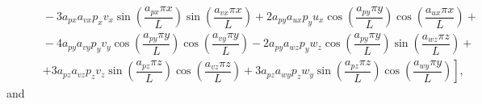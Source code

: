 \documentclass[10pt]{article}
\begin{document}
\begin{equation}
\begin{split}
    &\qquad-3 a_{px} a_{vx} p_x v_x \sin\left(\dfrac{a_{px} \pi x}{L}\right) \sin\left(\dfrac{a_{vx} \pi x}{L}\right)+2 a_{py} a_{ux} p_y u_x \cos\left(\dfrac{a_{py} \pi y}{L}\right) \cos\left(\dfrac{a_{ux} \pi x}{L}\right)+\\
    &\qquad-4 a_{py} a_{vy} p_y v_y \cos\left(\dfrac{a_{py} \pi y}{L}\right) \cos\left(\dfrac{a_{vy} \pi y}{L}\right)-2 a_{py} a_{wz} p_y w_z \cos\left(\dfrac{a_{py} \pi y}{L}\right) \sin\left(\dfrac{a_{wz} \pi z}{L}\right)+\\
    &\qquad\left.+3 a_{pz}a_{vz} p_z  v_z \sin\left(\dfrac{a_{pz} \pi z}{L}\right) \cos\left(\dfrac{a_{vz} \pi z}{L}\right)+3 a_{pz} a_{wy} p_z w_y \sin\left(\dfrac{a_{pz} \pi z}{L}\right) \cos\left(\dfrac{a_{wy} \pi y}{L}\right)\right]
,
 \end{split}
\end{equation}
and
\end{document}
